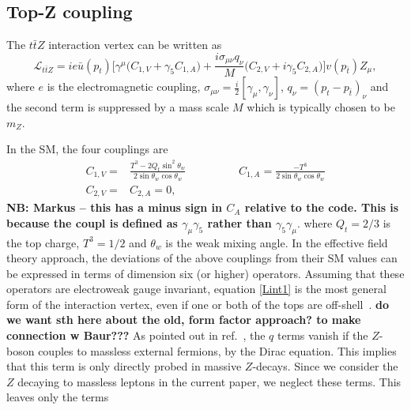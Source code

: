 \documentclass[preprint]{JHEP3} %
\def\ttbZ{t\bar{t}Z}
\def\sw{\sin \theta_w}
\def\swsq{\sin^2 \theta_w}
\def\cw{\cos \theta_w}
\begin{document}
\subsection{Top-Z coupling}
The $\ttbZ$ interaction vertex can be written as
\begin{equation} \label{Lint1}
\mathcal{L}_{\ttbZ} = i e \bar{u}(p_t)\biggl[ \gamma^{\mu} \bigl(C_{1,V} + \gamma_5 C_{1,A} \bigr) + \frac{i \sigma_{\mu \nu} q_{\nu}}{M} \bigl(C_{2,V} + i\gamma_5 C_{2,A} \bigr) \biggr] v(p_{\bar{t}}) Z_{\mu},
\end{equation}
where $e$ is the electromagnetic coupling, $\sigma_{\mu \nu}=\frac{i}{2} [ \gamma_{\mu},\gamma_{\nu} ]$, $q_{\nu} = (p_{t}-p_{\bar{t}})_{\nu}$ and the second term is suppressed by a mass scale $M$ which is typically chosen to be $m_Z$. 

In the SM, the four couplings are 
\begin{equation}
\begin{split}
C_{1,V} =& \frac{T^3 - 2Q_t \swsq}{2\sw \cw}  \hspace{2cm} C_{1,A} = \frac{-T^3}{2 \sw \cw}  \\
C_{2,V}= & C_{2,A}=0,
\end{split}
\end{equation}
{\bf NB: Markus -- this has a minus sign in $C_A$ relative to the code. This is because the coupl is defined as $\gamma_{\mu} \gamma_5$ rather than $\gamma_5 \gamma_{\mu}$}.
where $Q_t = 2/3$ is the top charge, $T^3=1/2$ and $\theta_w$ is the weak mixing angle. In the effective field theory approach, the deviations of the above couplings from their SM values can be expressed in terms of dimension six (or higher) operators. Assuming that these operators are electroweak gauge invariant, equation \eqref{Lint1} is the most general form of the interaction vertex, even if one or both of the tops are off-shell~\cite{}. 
{\bf do we want sth here about the old, form factor approach? to make connection w Baur???} 
As pointed out in ref.~\cite{}, the $q$ terms vanish if the $Z$-boson couples to massless external fermions, by the Dirac equation. This implies that this term is only directly probed in massive $Z$-decays. Since we consider the $Z$ decaying to massless leptons in the current paper, we neglect these terms. This leaves only the terms
\end{document}

